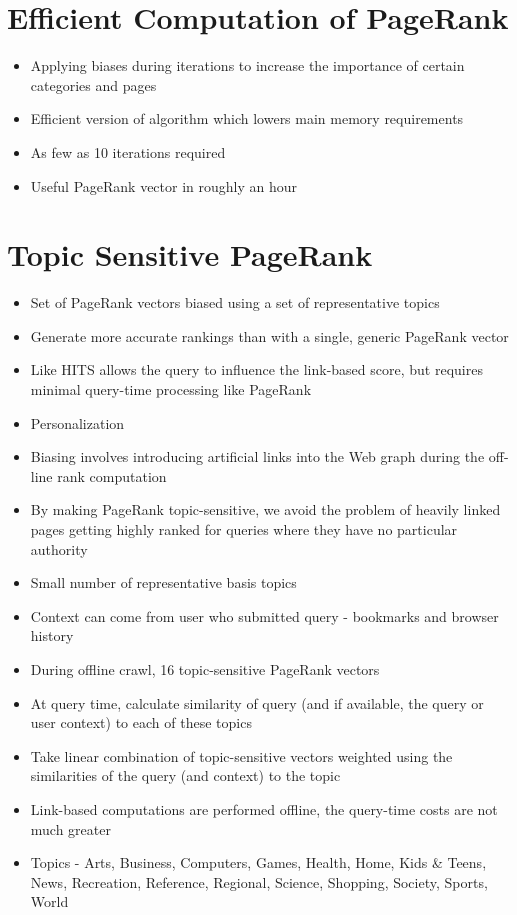 \documentclass[11pt]{report}
\begin{document}
\section{Efficient Computation of PageRank}
\begin{itemize}
\item Applying biases during iterations to increase the importance of certain categories and pages
\item Efficient version of algorithm which lowers main memory requirements
\item As few as 10 iterations required
\item Useful PageRank vector in roughly an hour
\end{itemize}
\section{Topic Sensitive PageRank}
\begin{itemize}
\item Set of PageRank vectors biased using a set of representative topics
\item Generate more accurate rankings than with a single, generic PageRank vector
\item Like HITS allows the query to influence the link-based score, but requires minimal query-time processing like PageRank
\item Personalization
\item Biasing involves introducing artificial links into the Web graph during the off-line rank computation
\item By making PageRank topic-sensitive, we avoid the problem of heavily linked pages getting highly ranked for queries where they have no particular authority
\item Small number of representative basis topics
\item Context can come from user who submitted query - bookmarks and browser history
\item During offline crawl, 16 topic-sensitive PageRank vectors 
\item At query time, calculate similarity of query (and if available, the query or user context) to each of these topics
\item Take linear combination of topic-sensitive vectors weighted using the similarities of the query (and context) to the topic
\item Link-based computations are performed offline, the query-time costs are not much greater
\item Topics - Arts, Business, Computers, Games, Health, Home, Kids \& Teens, News, Recreation, Reference, Regional, Science, Shopping, Society, Sports, World
\end{itemize}
\end{document}
